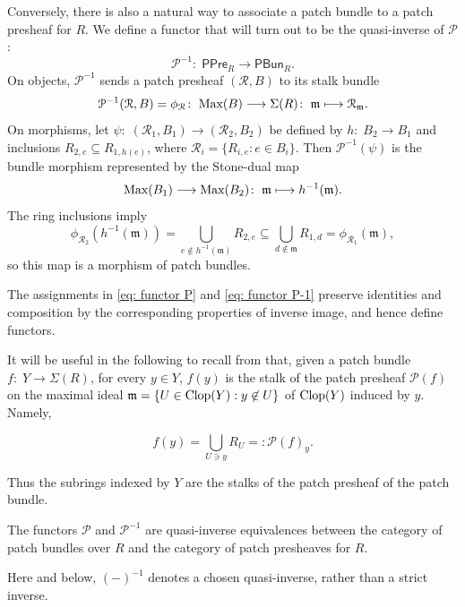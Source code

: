 \documentclass[11pt]{amsart}
\def\m{{\mathfrak m}} %
\begin{document}
Conversely, there is also a natural way   to associate a patch bundle to a patch presheaf for $R$. We define a functor that will turn out to be the  quasi-inverse of ${\mathcal P}$:
\begin{equation}\label{eq: functor P-1}
\mathcal P^{-1}\colon\; \mathsf{PPre}_R\to \mathsf{PBun}_R.
\end{equation}
On objects, $\mathcal P^{-1}$ sends a patch presheaf $(\mathcal R,B)$ to its stalk bundle
\[
\mathcal P^{-1}(\mathcal R,B)=\phi_{\mathcal R}\colon\; \Max(B)\longrightarrow\Sigma(R)\colon\; \m\longmapsto\mathcal R_{\m}.
\]
On morphisms, let $\psi\colon\; (\mathcal R_1,B_1)\to(\mathcal R_2,B_2)$ be defined by $h\colon\; B_2\to B_1$ and inclusions $R_{2,e}\subseteq R_{1,h(e)}$, where $\mathcal R_i=\{R_{i,e}:e\in B_i\}$. Then $\mathcal P^{-1}(\psi)$ is the bundle morphism represented by the Stone-dual map
\[
\Max(B_1)\longrightarrow\Max(B_2)\colon\; \m\longmapsto h^{-1}(\m).
\]
The ring inclusions imply
\[
\phi_{\mathcal R_2}(h^{-1}(\m))
=\bigcup_{e\notin h^{-1}(\m)}R_{2,e}
\subseteq\bigcup_{d\notin\m}R_{1,d}
=\phi_{\mathcal R_1}(\m),
\]
so this map is a morphism of patch bundles.

The assignments in \eqref{eq: functor P} and \eqref{eq: functor P-1} preserve identities and composition by the corresponding properties of inverse image, and hence define functors.

It will be useful in the following to recall from \cite[Lemma 4.2]{CosOlb} that, given a patch bundle $f\colon\; Y \rightarrow \Sigma(R)$, for every $y\in Y$, $f(y)$ is the stalk of the patch presheaf ${\mathcal P}(f)$ on the maximal ideal $\m=\{U\in {\rm Clop}(Y):y \not \in U\}$ of ${\rm Clop}(Y)$ induced by $y$. Namely,

\begin{equation}\label{eq: stalk-reconstruction}
f(y)=\bigcup_{U\ni y} R_U =: {\mathcal P}(f)_y.
\end{equation}

Thus the subrings indexed by $Y$ are the stalks of the patch presheaf of the patch bundle.

\begin{theorem}\label{thm: bundle presheaf equivalence}
The functors $\mathcal P$ and $\mathcal P^{-1}$ are quasi-inverse equivalences between the category of patch bundles over $R$ and the category of patch presheaves for $R$.
\end{theorem}

Here and below, $(-)^{-1}$ denotes a chosen quasi-inverse, rather than a strict inverse.
\end{document}

